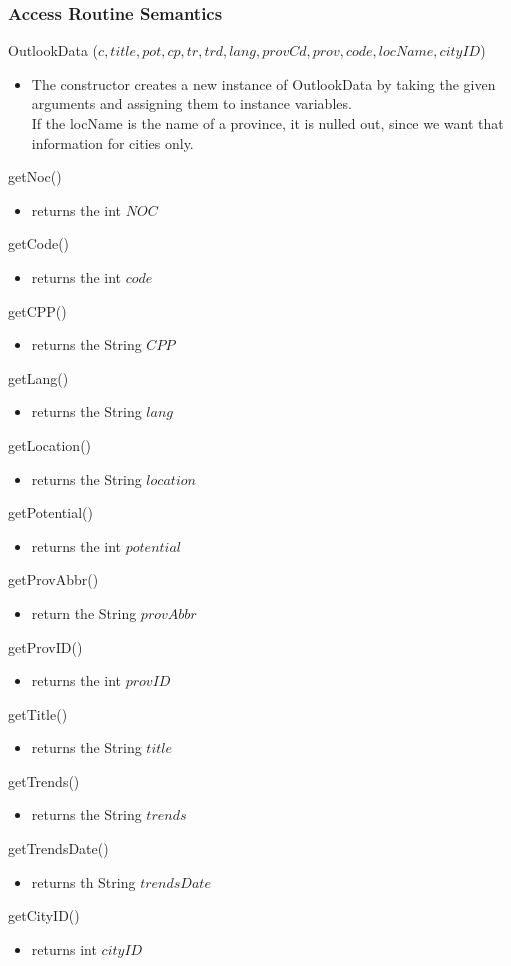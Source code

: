 \documentclass[12pt,fleqn]{article}
\begin{document}
\subsubsection*{Access Routine Semantics}
\noindent OutlookData ($c, title, pot, cp, tr, trd, lang, provCd, prov, code, locName , cityID$)
\begin{itemize}
\item The constructor creates a new instance of OutlookData by taking the given arguments and assigning them to instance variables. 
\\If the locName is the name of a province, it is nulled out, since we want that information for cities only.
\end{itemize}
\noindent getNoc()
\begin{itemize}
\item returns the int $NOC$
\end{itemize}
\noindent getCode()
\begin{itemize}
\item returns the int $code$
\end{itemize}
\noindent getCPP()
\begin{itemize}
\item returns the String $CPP$
\end{itemize}
\noindent getLang()
\begin{itemize}
\item returns the String $lang$
\end{itemize}
\noindent getLocation()
\begin{itemize}
\item returns the String $location$
\end{itemize}
\noindent getPotential()
\begin{itemize}
\item returns the int $potential$
\end{itemize}
\noindent getProvAbbr()
\begin{itemize}
\item return the String $provAbbr$
\end{itemize}
\noindent getProvID()
\begin{itemize}
\item returns the int $provID$
\end{itemize}
\noindent getTitle()
\begin{itemize}
\item returns the String $title$
\end{itemize}
\noindent getTrends()
\begin{itemize}
\item returns the String $trends$
\end{itemize}
\noindent getTrendsDate()
\begin{itemize}
\item returns th String $trendsDate$
\end{itemize}
\noindent getCityID()
\begin{itemize}
\item returns int $cityID$
\end{itemize}
\end{document}
